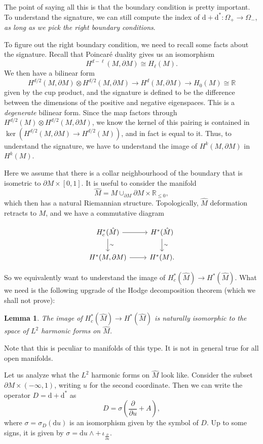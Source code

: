 \documentclass{shortart}
\newtheorem{lemma}[thm]{Lemma}
\theoremstyle{definition}
\newcommand\R{\mathbb{R}}
\renewcommand\d{\mathrm{d}}
\begin{document}
The point of saying all this is that the boundary condition is pretty important. To understand the signature, we can still compute the index of $\d + \d^*: \Omega_+ \to \Omega_-$, \emph{as long as we pick the right boundary conditions}.

To figure out the right boundary condition, we need to recall some facts about the signature. Recall that Poincar\'e duality gives us an isomorphism
\[
  H^{d - \ell}(M, \partial M) \cong H_\ell(M).
\]
We then have a bilinear form
\[
  H^{d/2}(M, \partial M) \otimes H^{d/2}(M, \partial M) \to H^{d}(M, \partial M) \to H_0(M) \cong \R
\]
given by the cup product, and the signature is defined to be the difference between the dimensions of the positive and negative eigenspaces. This is a \emph{degenerate} bilinear form. Since the map factors through $H^{d/2}(M) \otimes H^{d/2}(M, \partial M)$, we know the kernel of this pairing is contained in $\ker(H^{d/2}(M, \partial M) \to H^{d/2}(M))$, and in fact is equal to it. Thus, to understand the signature, we have to understand the image of $H^k(M, \partial M)$ in $H^k(M)$.

Here we assume that there is a collar neighbourhood of the boundary that is isometric to $\partial M \times [0, 1]$. It is useful to consider the manifold
\[
  \hat{M} = M \cup_{\partial M} \partial M \times \R_{\leq 0},
\]
which then has a natural Riemannian structure. Topologically, $\hat{M}$ deformation retracts to $M$, and we have a commutative diagram
\begin{useimager}
  \[
    \begin{tikzcd}
      H^*_c(\hat{M}) \ar[r] \ar[d, "\sim"] & H^*(\hat{M}) \ar[d, "\sim"]\\
      H^*(M, \partial M) \ar[r] & H^*(M).
    \end{tikzcd}
  \]
\end{useimager}

So we equivalently want to understand the image of $H^*_c(\hat{M}) \to H^*(\hat{M})$. What we need is the following upgrade of the Hodge decomposition theorem (which we shall not prove):
\begin{lemma}
  The image of $H^*_c(\hat{M}) \to H^*(\hat{M})$ is naturally isomorphic to the space of $L^2$ harmonic forms on $\hat{M}$.\fakeqed
\end{lemma}

Note that this is peculiar to manifolds of this type. It is not in general true for all open manifolds.

Let us analyze what the $L^2$ harmonic forms on $\hat{M}$ look like. Consider the subset $\partial M \times (-\infty, 1)$, writing $u$ for the second coordinate. Then we can write the operator $D = \d + \d^*$ as
\[
  D = \sigma \left(\frac{\partial}{\partial u} + A\right),
\]
where $\sigma = \sigma_D(\d u)$ is an isomorphism given by the symbol of $D$. Up to some signs, it is given by $\sigma = \d u \wedge +\, \iota_{\frac{\partial}{\partial u}}$.
\end{document}
